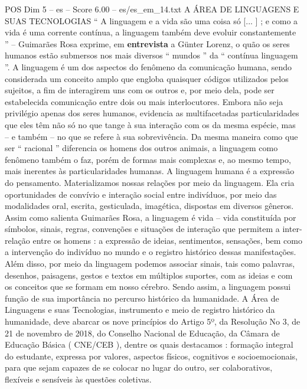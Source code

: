 \begin{textsample}{POS Dim 5 – es – Score 6.00 – es/es\_em\_14.txt}  \label{ex:f5_pos_109}
A ÁREA DE LINGUAGENS E SUAS TECNOLOGIAS “ A linguagem e a vida são uma coisa só [... ] ; e como a vida é uma corrente contínua, a linguagem também deve evoluir constantemente ” – Guimarães Rosa exprime, em \textbf{entrevista} a Günter Lorenz, o quão os seres humanos estão submersos nos mais diversos “ mundos ” da “ contínua linguagem ”.
A linguagem é um dos aspectos do fenômeno da comunicação humana, sendo considerada um conceito amplo que engloba quaisquer códigos utilizados pelos sujeitos, a fim de interagirem uns com os outros e, por meio dela, pode ser estabelecida comunicação entre dois ou mais interlocutores.
Embora não seja privilégio apenas dos seres humanos, evidencia as multifacetadas particularidades que eles têm não só no que tange à sua interação com os da mesma espécie, mas – e também – no que se refere à sua sobrevivência.
Da mesma maneira como que ser “ racional ” diferencia os homens dos outros animais, a linguagem como fenômeno também o faz, porém de formas mais complexas e, ao mesmo tempo, mais inerentes às particularidades humanas.
A linguagem humana é a expressão do pensamento.
Materializamos nossas relações por meio da linguagem.
Ela cria oportunidades de convívio e interação social entre indivíduos, por meio das modalidades oral, escrita, gesticulada, imagética, dispostas em diversos gêneros.
Assim como salienta Guimarães Rosa, a linguagem é vida – vida constituída por símbolos, sinais, regras, convenções e situações de interação que permitem a inter-relação entre os homens : a expressão de ideias, sentimentos, sensações, bem como a intervenção do indivíduo no mundo e o registro histórico dessas manifestações.
Além disso, por meio da linguagem podemos associar sinais, tais como palavras, desenhos, paisagens, gestos e textos em múltiplos suportes, com as ideias e com os conceitos que se formam em nosso cérebro.
Sendo assim, a linguagem possui função de sua importância no percurso histórico da humanidade.
A Área de Linguagens e suas Tecnologias, instrumento e meio de registro histórico da humanidade, deve abarcar os nove princípios do Artigo 5º, da Resolução No 3, de 21 de novembro de 2018, do Conselho Nacional de Educação, da Câmara de Educação Básica ( CNE/CEB ), dentre os quais destacamos : formação integral do estudante, expressa por valores, aspectos físicos, cognitivos e socioemocionais, para que sejam capazes de se colocar no lugar do outro, ser colaborativos, flexíveis e sensíveis às questões coletivas.

\end{textsample}
